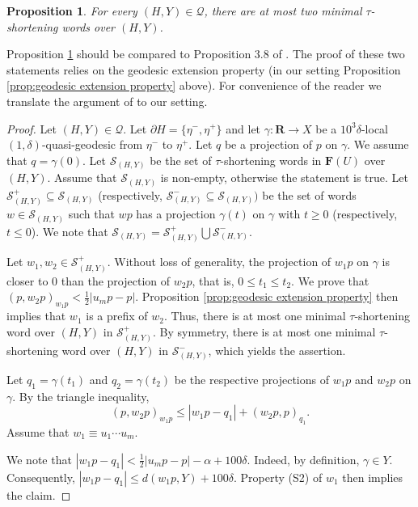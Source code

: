 \documentclass[leqno,a4paper,10pt]{amsart}
\theoremstyle{plain}
\newtheorem{prop}[thm]{Proposition}
\theoremstyle{definition}
\theoremstyle{remark}
\newcommand{\R}{\mathbf{R}}
\newcommand{\F}{\mathbf{F}}
\newcommand{\scrQ}{\mathscr{Q}}
\newcommand{\scrS}{\mathscr{S}}
\let\le\leqslant
\let\ge\geqslant
\begin{document}
\begin{prop}
	\label{prop:shortening-proper-prefix}
	For every $(H,Y)\in \scrQ$, there are at most two minimal $\tau$-shortening words over $(H,Y)$.
\end{prop}
Proposition \ref{prop:shortening-proper-prefix} should be compared to Proposition 3.8 of \cite{coulon_product_2022}. The proof of these two statements relies on the geodesic extension property (in our setting Proposition \ref{prop:geodesic extension property} above). For convenience of the reader we translate the argument of \cite{coulon_product_2022} to our setting.  
\begin{proof}  
	Let $(H,Y)\in \scrQ$. Let $\partial H =\{\eta^-,\eta^+\}$ and let $\gamma\colon \R\to X$ be a $10^3\delta$-local $(1,\delta)$-quasi-geodesic from $\eta^-$ to $\eta^+$. Let $q$ be a projection of $p$ on $\gamma$. We assume that $q=\gamma(0)$. Let $\scrS_{(H,Y)}$ be the set of $\tau$-shortening words in $\F (U)$ over $(H,Y)$. Assume that $\scrS_{(H,Y)}$ is non-empty, otherwise the statement is true. Let $\scrS_{(H,Y)}^+\subseteq \scrS_{(H,Y)}$ (respectively, $\scrS_{(H,Y)}^- \subseteq \scrS_{(H,Y)})$ be the set of words $w\in \scrS_{(H,Y)}$ such that $wp$ has a projection $\gamma(t)$ on $\gamma$ with $t\ge 0$ (respectively, $t\le0$). We note that $\scrS_{(H,Y)}=\scrS_{(H,Y)}^+\bigcup \scrS_{(H,Y)}^-$.
	
	Let $w_1,w_2\in \scrS_{(H,Y)}^+$. Without loss of generality, the projection of $w_1p$ on $\gamma$ is closer to $0$ than the projection of $w_2p$, that is,  $0\le t_1\le t_2$. We prove that $(p,w_2p)_{w_1p}< \frac{1}{2}|u_mp-p|.$ Proposition \ref{prop:geodesic extension property} then implies that $w_1$ is a prefix of $w_2$. Thus, there is at most one minimal $\tau$-shortening word over $(H,Y)$ in $\scrS_{(H,Y)}^+$. By symmetry, there is at most one minimal $\tau$-shortening word over $(H,Y)$ in $\scrS_{(H,Y)}^-$, which yields the assertion. 
	 
	 Let $q_1=\gamma(t_1)$ and $q_2=\gamma(t_2)$ be the respective projections of $w_1p$ and $w_2p$ on $\gamma$. 
	 By the triangle inequality,
		\begin{equation}
				\label{eqn:shortening-2-1}
				(p,w_2p)_{w_1p}\le |w_1p-q_1|+(w_2p,p)_{q_1}.
		\end{equation}
		Assume that $w_1\equiv u_1\cdots u_m$.  

We  note that $|w_1p-q_1|<\frac{1}{2}|u_mp-p|-\alpha+100\delta$. Indeed, by definition, $\gamma\in Y$. Consequently, $|w_1p-q_1|\le d(w_1p,Y)+100\delta$.
		Property (S2) of $w_1$ then implies the claim. 
				

\end{proof}
\end{document}
